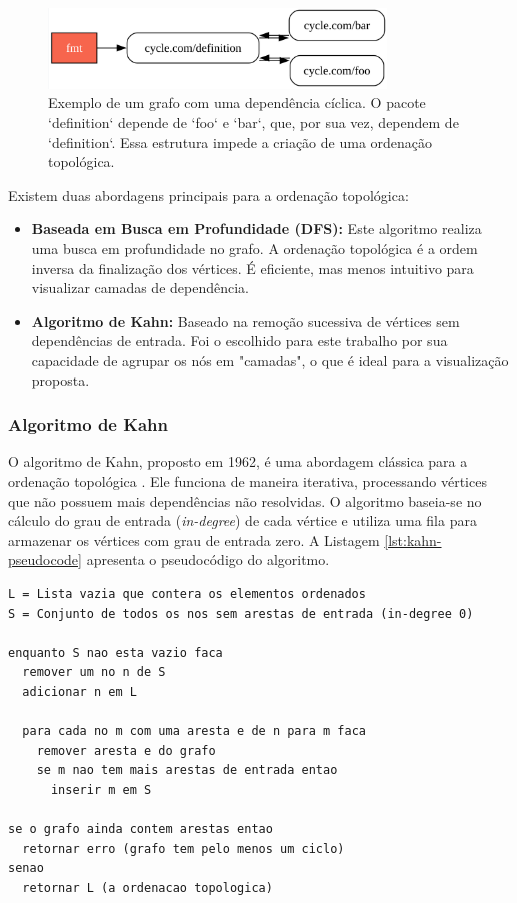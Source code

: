 \documentclass[12pt]{article}
\begin{document}
\begin{figure}[htbp]
    \centering
    \includegraphics[width=0.8\textwidth]{examples/cycle.png}
    \caption{Exemplo de um grafo com uma dependência cíclica. O pacote `definition` depende de `foo` e `bar`, que, por sua vez, dependem de `definition`. Essa estrutura impede a criação de uma ordenação topológica.}
    \label{fig:grafo-ciclico}
\end{figure}

Existem duas abordagens principais para a ordenação topológica:

\begin{itemize}
    \item \textbf{Baseada em Busca em Profundidade (DFS):} Este algoritmo realiza uma busca em profundidade no grafo. A ordenação topológica é a ordem inversa da finalização dos vértices. É eficiente, mas menos intuitivo para visualizar camadas de dependência.
    \item \textbf{Algoritmo de Kahn:} Baseado na remoção sucessiva de vértices sem dependências de entrada. Foi o escolhido para este trabalho por sua capacidade de agrupar os nós em "camadas", o que é ideal para a visualização proposta.
\end{itemize}

\subsubsection{Algoritmo de Kahn}
O algoritmo de Kahn, proposto em 1962, é uma abordagem clássica para a ordenação topológica \cite{kahn1962}. Ele funciona de maneira iterativa, processando vértices que não possuem mais dependências não resolvidas. O algoritmo baseia-se no cálculo do grau de entrada (\textit{in-degree}) de cada vértice e utiliza uma fila para armazenar os vértices com grau de entrada zero. A Listagem \ref{lst:kahn-pseudocode} apresenta o pseudocódigo do algoritmo.

\begin{lstlisting}[language={}, caption={Pseudocódigo do Algoritmo de Kahn}, label={lst:kahn-pseudocode}]
L = Lista vazia que contera os elementos ordenados
S = Conjunto de todos os nos sem arestas de entrada (in-degree 0)

enquanto S nao esta vazio faca
  remover um no n de S
  adicionar n em L
  
  para cada no m com uma aresta e de n para m faca
    remover aresta e do grafo
    se m nao tem mais arestas de entrada entao
      inserir m em S

se o grafo ainda contem arestas entao
  retornar erro (grafo tem pelo menos um ciclo)
senao
  retornar L (a ordenacao topologica)
\end{lstlisting}
\end{document}
